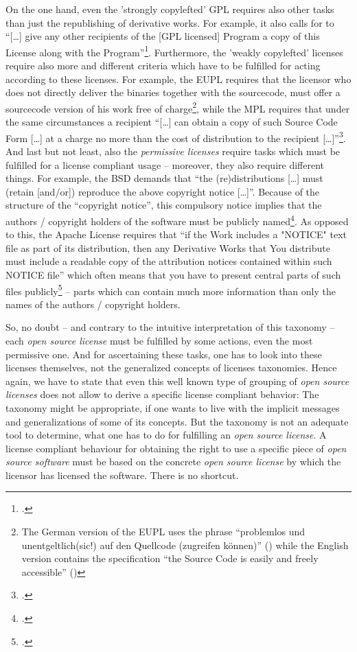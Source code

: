 On the one hand, even the 'strongly copylefted' GPL requires also other tasks
than just the republishing of derivative works. For example, it also calls for
to \enquote{[\ldots] give any other recipients of the [GPL licensed] Program a
copy of this License along with the Program}\footcite[cf.][\nopage wp.\
§1]{Gpl20OsiLicense1991a}. Furthermore, the 'weakly copylefted' licenses require
also more and different criteria which have to be fulfilled for acting according
to these licenses. For example, the EUPL requires that the licensor who does not
directly deliver the binaries together with the sourcecode, must offer a
sourcecode version of his work free of charge\footnote{The German version of the
EUPL uses the phrase \enquote{problemlos und unentgeltlich(sic!) auf den
Quellcode (zugreifen können)} (\cite[cf.][3, section 3]{EuplLicense2007de})
while the English version contains the specification \enquote{the Source Code is
easily and freely accessible} (\cite[cf.][2, section 3]{EuplLicense2007en})},
while the MPL requires that under the same circumstances a recipient
\enquote{[\ldots] can obtain a copy of such Source Code Form [\ldots] at a
charge no more than the cost of distribution to the recipient
[\ldots]}\footcite[cf.][\nopage section 3.2.a]{Mpl20OsiLicense2013a}.
And last but not least, also the \emph{permissive licenses} require tasks which
must be fulfilled for a license compliant usage -- moreover, they also require
different things. For example, the BSD demands that \enquote{the
(re)distributions [\ldots] must (retain [and/or]) reproduce the above copyright
notice [\ldots]}. Because of the structure of the \enquote{copyright notice},
this compulsory notice implies that the authors / copyright holders of the
software must be publicly named\footcite[cf.][\nopage wp]{BsdLicense2Clause}. As
opposed to this, the Apache License requires that \enquote{if the Work includes
a "NOTICE" text file as part of its distribution, then any Derivative Works that
You distribute must include a readable copy of the attribution notices contained
within such NOTICE file} which often means that you have to present central
parts of such files publicly\footcite[cf.][\nopage wp.\ section
4.4]{Apl20OsiLicense2004a} -- parts which can contain much more information than
only the names of the authors / copyright holders.

So, no doubt -- and contrary to the intuitive interpretation of this taxonomy --
each \emph{open source license} must be fulfilled by some actions, even the most
permissive one. And for ascertaining these tasks, one has to look into these
licenses themselves, not the generalized concepts of licenses taxonomies. Hence
again, we have to state that even this well known type of grouping of \emph{open
source licenses} does not allow to derive a specific license compliant behavior:
The taxonomy might be appropriate, if one wants to live with the implicit
messages and generalizations of some of its concepts. But the taxonomy is not an
adequate tool to determine, what one has to do for fulfilling an \emph{open
source license}. A license compliant behaviour for obtaining the right to use a
specific piece of \emph{open source software} must be based on the concrete
\emph{open source license} by which the licensor has licensed the software.
There is no shortcut.


